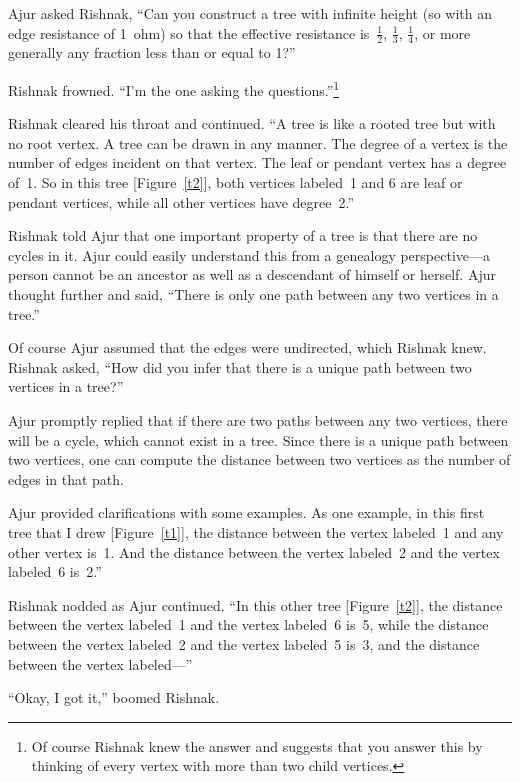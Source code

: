 Ajur asked Rishnak, ``Can you construct a tree with infinite height (so with an edge resistance of 1~ohm) so that the effective resistance is~$\frac{1}{2}$, $\frac{1}{3}$, $\frac{1}{4}$, or more generally any fraction less than or equal to 1?''

Rishnak frowned. ``I'm the one asking the questions.''\footnote{Of course Rishnak knew the answer and suggests that you answer this by thinking of every vertex with more than two child vertices.}

Rishnak cleared his throat and continued. ``A tree is like a rooted tree but with no root vertex. A tree can be drawn in any manner. The degree of a vertex is the number of edges incident on that vertex. The leaf or pendant vertex has a degree of~1. So in this tree [Figure~\ref{t2}], both vertices labeled~1 and 6 are leaf or pendant vertices, while all other vertices have degree~2.''

Rishnak told Ajur that one important property of a tree is that there are no cycles in it. Ajur could easily understand this from a genealogy perspective---a person cannot be an ancestor as well as a descendant of himself or herself.
Ajur thought further and said, ``There is only one path between any two vertices in a tree.''

Of course Ajur assumed that the edges were undirected, which Rishnak knew. Rishnak asked, ``How did you infer that there is a unique path between two vertices in a tree?''

Ajur promptly replied that if there are two paths between any two vertices, there will be a cycle, which cannot exist in a tree. Since there is a unique path between two vertices, one can compute the distance between two vertices as the number of edges in that path.

Ajur provided clarifications with some examples. As one example, in this first tree that I drew [Figure~\ref{t1}], the distance between the vertex labeled~1 and any other vertex is~1. And the distance between the vertex labeled~2 and the vertex labeled~6 is~2.''

Rishnak nodded as Ajur continued. ``In this other tree [Figure~\ref{t2}], the distance between the vertex labeled~1 and the vertex labeled~6 is~5, while the distance between the vertex labeled~2 and the vertex labeled~5 is~3, and the distance between the vertex labeled---''

``Okay, I got it,'' boomed Rishnak.

